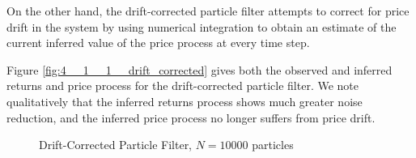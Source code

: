 \documentclass[../main.tex]{subfiles}
\begin{document}
On the other hand, the drift-corrected particle filter attempts to correct for price drift in the system by using numerical integration to obtain an estimate of the current inferred value of the price process at every time step. 

Figure \ref{fig:4__1__1__drift_corrected} gives both the observed and inferred returns and price process for the drift-corrected particle filter. We note qualitatively that the inferred returns process shows much greater noise reduction, and the inferred price process no longer suffers from price drift. 

\begin{figure}[h!]
	\centering
	\qquad
	\caption{Drift-Corrected Particle Filter, $N = 10000$ particles}
	\label{fig:4__1__1__drift_corrected_PF}
\end{figure}
\end{document}
